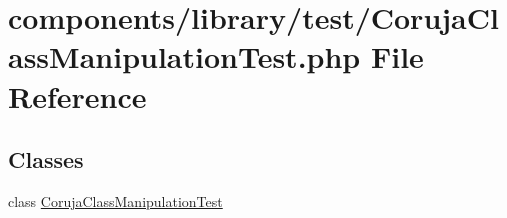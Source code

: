 \hypertarget{_coruja_class_manipulation_test_8php}{
\section{components/library/test/CorujaClassManipulationTest.php File Reference}
\label{_coruja_class_manipulation_test_8php}
}
\subsection*{Classes}
\begin{CompactItemize}
\item 
class \hyperlink{class_coruja_class_manipulation_test}{CorujaClassManipulationTest}
\end{CompactItemize}
